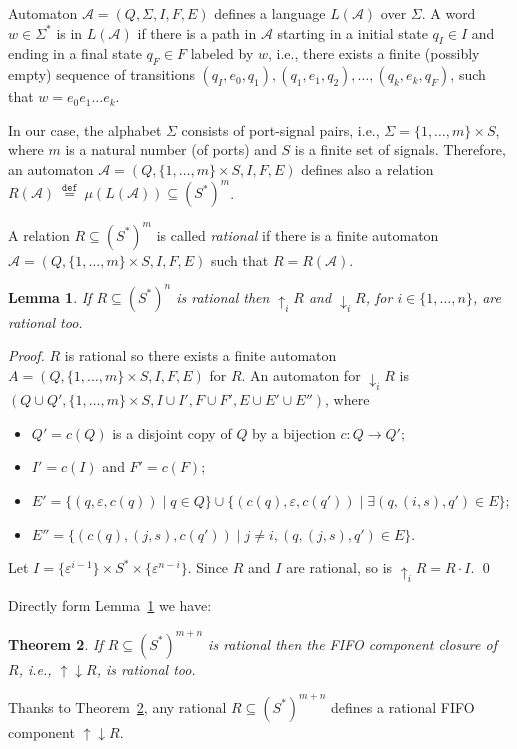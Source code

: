 \documentclass{llncs}
\newtheorem{thm}{Theorem}
\newtheorem{lem}[thm]{Lemma}
\newcommand{\udarrow}{{\uparrow\downarrow}}
\newcommand{\df}[1]{\ \stackrel{\mathtt{def}}{#1}\ }
\begin{document}
Automaton $\mathcal{A}=(Q,\Sigma,I,F,E)$ defines a language
$L(\mathcal{A})$ over $\Sigma$. A word $w\in\Sigma^{\ast}$ is in
$L(\mathcal{A})$ if there is a path in $\mathcal{A}$ starting in a
initial state $q_I\in I$ and ending in a final state $q_F\in F$
labeled by $w$, i.e., there exists a finite (possibly empty) sequence
of transitions $(q_I,e_0,q_1), (q_1,e_1,q_2),\ldots, (q_k,e_k,q_F)$,
such that $w=e_0e_1\ldots e_k$. 

In our case, the alphabet $\Sigma$ consists of port-signal pairs,
i.e., $\Sigma=\{1,\ldots,m\}\times S$, where $m$ is a natural number
(of ports) and $S$ is a finite set of signals. Therefore, an automaton
$\mathcal{A}=(Q,\{1,\ldots,m\}\times S,I,F,E)$ defines also a
relation $R(\mathcal{A})\df{=}\mu(L(\mathcal{A}))\subseteq (S^\ast)^m$.

A relation $R\subseteq (S^\ast)^m$ is called \emph{rational} if there
is a finite automaton $\mathcal{A}=(Q,\{1,\ldots,m\}\times S,I,F,E)$
such that $R=R(\mathcal{A})$. 


\begin{lem}\label{lem:updown-rat}
  If $R\subseteq(S^\ast)^{n}$ is rational then ${\uparrow_i}R$ and
  ${\downarrow_i}R$, for $i\in \{1,\ldots,n\}$, are rational too.
\end{lem}

\begin{proof}
  $R$ is rational so there exists a finite automaton
  $A=(Q,\{1,\ldots,m\}\times S, I, F, E)$ for $R$. An automaton for
    ${\downarrow_i}R$ is $(Q\cup Q',\{1,\ldots,m\}\times S, I\cup I',
      F\cup F', E\cup E'\cup E'')$, where
      \begin{itemize}
      \item $Q'=c(Q)$ is a disjoint copy of $Q$ by a bijection
        $c:Q\rightarrow Q'$;
      \item $I'=c(I)$ and $F'= c(F)$;
      \item $E'=\{(q,\varepsilon,c(q))\mid q\in Q\}\cup
        \{(c(q),\varepsilon,c(q'))\mid \exists (q,(i,s),q')\in E\}$;
      \item $E''=\{(c(q),(j,s),c(q'))\mid j\neq i, (q,(j,s),q')\in E\}$.
      \end{itemize}

      Let $I=\{\varepsilon^{i-1}\}\times S^\ast \times
      \{\varepsilon^{n-i}\}$. Since $R$ and $I$ are rational, so is
      ${\uparrow_i}R = R\cdot I$. \qed
\end{proof}


Directly form Lemma~\ref{lem:updown-rat} we have:
\begin{thm}
  \label{thm:rat}
  If $R\subseteq(S^\ast)^{m+n}$ is rational then the FIFO component
  closure of $R$, i.e., ${\udarrow}R$, is rational too.
\end{thm}
Thanks to Theorem~\ref{thm:rat}, any rational $R\subseteq (S^\ast)^{m+n}$
defines a rational FIFO component ${\udarrow}R$.
\end{document}
